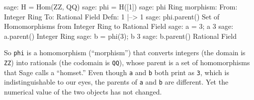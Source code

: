 %
\begin{sageexample}
sage: H = Hom(ZZ, QQ)
sage: phi = H([1])
sage: phi
Ring morphism:
  From: Integer Ring
  To:   Rational Field
  Defn: 1 |--> 1
sage: phi.parent()
Set of Homomorphisms from Integer Ring to Rational Field
sage: a = 3; a
3
sage: a.parent()
Integer Ring
sage: b = phi(3); b
3
sage: b.parent()
Rational Field
\end{sageexample}
%
So \verb?phi? is a homomorphism (``morphism'') that converts integers (the domain is \verb?ZZ?) into rationals (the codomain is \verb?QQ?), whose parent is a set of homomorphisms that Sage calls a ``homset.''  Even though \verb?a? and \verb?b? both print as \verb?3?, which is indistinguishable to our eyes, the parents of \verb?a? and \verb?b? are different.  Yet the numerical value of the two objects has not changed.
%




